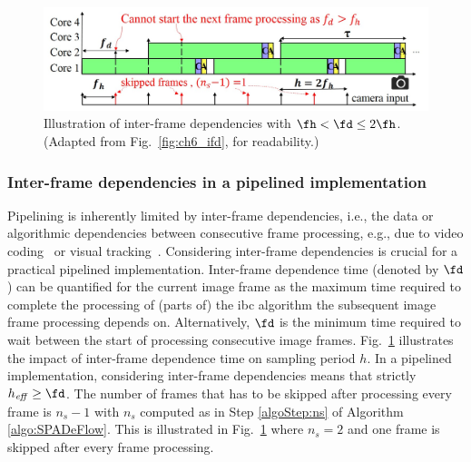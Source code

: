 \begin{figure}[ht]
\centerline{
    \includegraphics[width=\textwidth]{images/ifd.jpg}
    }
    \caption{Illustration of inter-frame dependencies with $\fh < \fd \le 2\fh$. (Adapted from Fig.~\ref{fig:ch6_ifd}, for readability.)}
    \label{fig:ch7_ifd}
\end{figure}
\subsubsection{Inter-frame dependencies in a pipelined implementation}
\label{sec:ch7_IFD}
Pipelining is inherently limited by inter-frame dependencies, i.e., the data or algorithmic dependencies between consecutive frame processing, e.g., due to video coding~\cite{li2015lagrangian} or visual tracking~\cite{smeulders2013visual}. 
Considering inter-frame dependencies is crucial for a practical pipelined implementation.
Inter-frame dependence time (denoted by $\fd$) can be quantified for the current image frame as the maximum time required to complete the processing of (parts of) the \gls{ibc} algorithm the subsequent image frame processing depends on. 
Alternatively, $\fd$ is the minimum time required to wait between the start of processing consecutive image frames.
Fig.~\ref{fig:ch7_ifd} illustrates the impact of inter-frame dependence time on sampling period $h$.
In a pipelined implementation, considering inter-frame dependencies means that strictly $h_{\mathit{eff}}\ge \fd$.
The number of frames that has to be skipped after processing every frame is $n_s-1$ with $n_s$ computed as in Step \ref{algoStep:ns} of Algorithm \ref{algo:SPADeFlow}. This is illustrated in Fig.~\ref{fig:ch7_ifd} where $n_s=2$ and one frame is skipped after every frame processing.

